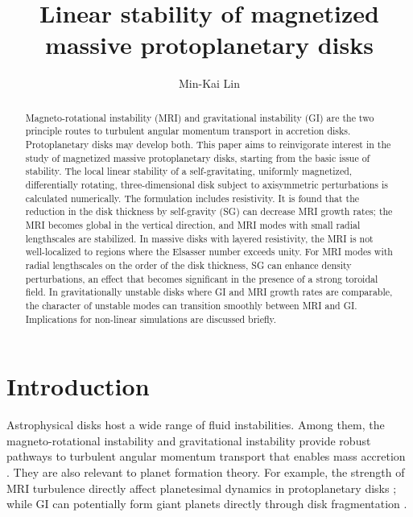 \documentclass[iop]{emulateapj}
\begin{document}
\title{Linear stability of magnetized massive protoplanetary disks}


\author{Min-Kai Lin }%

\begin{abstract}
  Magneto-rotational instability (MRI) and gravitational instability
  (GI) are the two principle routes to turbulent angular momentum
  transport in accretion disks. Protoplanetary disks may develop 
  both. This paper aims to reinvigorate interest in the study of
  magnetized  massive protoplanetary disks, starting from the basic
  issue of stability. The local linear stability of a 
  self-gravitating, uniformly magnetized, differentially rotating, 
  three-dimensional disk subject to axisymmetric perturbations is
  calculated numerically. The formulation includes 
  resistivity. It is found that the reduction in the disk thickness
  by self-gravity (SG) can decrease MRI growth rates; the MRI
  becomes global in the vertical direction, and MRI modes 
  with small radial lengthscales are stabilized. In massive
  disks with layered resistivity, the MRI is not well-localized
  to regions where the Elsasser number exceeds unity. For MRI modes
  with radial lengthscales on the order of the disk thickness, SG
  can enhance density perturbations, an effect that becomes 
  significant in the presence of a strong toroidal field. In
  gravitationally unstable disks where GI and MRI growth rates are
  comparable, the character of unstable modes can transition smoothly
  between MRI and GI. Implications for non-linear simulations are
  discussed briefly.   

%
\end{abstract}

\section{Introduction}
Astrophysical disks host a wide range of fluid instabilities. Among
them, the magneto-rotational instability \citep[MRI,][]{chandrasekhar61,
  balbus91,balbus98} %
and gravitational instability \citep[GI, ][]{toomre64,goldreich65a,goldreich65b} 
provide robust pathways to turbulent angular momentum transport that
enables mass accretion \citep[][ 
  and references therein]{balbus99,armitage11,turner14}.   
They are also relevant to planet formation theory. For example,
the strength of MRI turbulence directly affect planetesimal dynamics
in protoplanetary disks \citep{yang12,gressel12}; while GI can
potentially form giant planets directly through disk fragmentation
\citep{boss97,boss98,gammie01,voro13,helled14}. 
\end{document}
